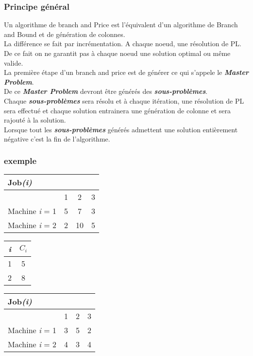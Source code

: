 \subsubsection{Principe général}
Un algorithme de branch and Price est l'équivalent d'un algorithme de Branch and Bound et de génération de colonnes. \\
La différence se fait par incrémentation. A chaque noeud, une résolution de PL. De ce fait on ne garantit pas à chaque noeud une solution optimal ou même valide. 
\\
La première étape d'un branch and price est de générer ce qui s'appele le \textbf{\textit{Master Problem}}.\\
De ce \textbf{\textit{Master Problem}} devront être générés des \textbf{\textit{sous-problèmes}}. \\
Chaque \textbf{\textit{sous-problèmes}} sera résolu et à chaque itération, une résolution de PL sera effectué et chaque solution entrainera une génération de colonne et sera rajouté à la solution. \\
Lorsque tout les \textbf{\textit{sous-problèmes}} générés admettent une solution entièrement négative c'est la fin de l'algorithme.


\subsubsection{exemple}

\begin{tabular}{  p{2.5cm} c c c}
\hline
\textbf{Job}\textit{(i)} \\
\hline
 & 1 & 2 & 3 \\
 \hline
Machine \textit{i} = 1 & 5 & 7 & 3 \\
Machine \textit{i} = 2 & 2 & 10 & 5 \\
\hline
\end{tabular}

\vspace{1cm}

\begin{tabular}{c c}
\hline
\textit{i} & $C_\textit{i}$\\
\hline
1 & 5 \\
\hline
2 & 8\\
\hline
\end{tabular}

\vspace{1cm}

\begin{tabular}{  p{2.5cm} c c c}
\hline
\textbf{Job}\textit{(i)} \\
\hline
 & 1 & 2 & 3 \\
 \hline
Machine \textit{i} = 1 & 3 & 5 & 2 \\
Machine \textit{i} = 2 & 4 & 3 & 4 \\
\hline
\end{tabular}


